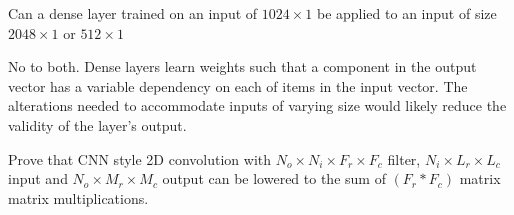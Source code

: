 \documentclass[11pt]{article}
\begin{document}
Can a dense layer trained on an input of $1024\times1$ be applied to an input
of size $2048\times1$ or $512\times1$

\begin{solution}
	No to both. Dense layers learn weights such that a component in the output
	vector has a variable dependency on each of items in the input vector. The
	alterations needed to accommodate inputs of varying size would likely
	reduce the validity of the layer's output.
\end{solution}

Prove that CNN style 2D convolution with $N_o \times N_i \times F_r \times F_c$
filter, $N_i \times L_r \times L_c$ input and $N_o \times M_r \times M_c$
output can be lowered to the sum of $(F_r * F_c)$ matrix matrix multiplications.
\end{document}
